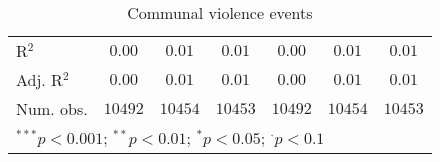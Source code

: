 \begin{sidewaystable}
\begin{center}
{\begin{tabular}{l c c c c c c}
\hline
R$^2$           & $0.00$          & $0.01$          & $0.01$          & $0.00$          & $0.01$       & $0.01$          \\
Adj. R$^2$      & $0.00$          & $0.01$          & $0.01$          & $0.00$          & $0.01$       & $0.01$          \\
Num. obs.       & $10492$         & $10454$         & $10453$         & $10492$         & $10454$      & $10453$         \\
\hline
\multicolumn{7}{l}{\scriptsize{$^{***}p<0.001$; $^{**}p<0.01$; $^{*}p<0.05$; $^{\cdot}p<0.1$}}
\end{tabular}
}
\caption{Communal violence events}
\label{org3}
\end{center}
\end{sidewaystable}

